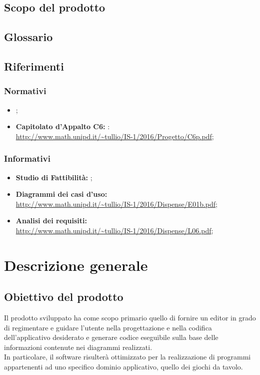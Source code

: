 	\subsection{Scopo del prodotto}
	\scopo{}
	
	\subsection{Glossario}
	\presgloss{}
	
	\subsection{Riferimenti}
		\subsubsection{Normativi}
		\begin{itemize}
			\item \emph{\NdP};
			\item \textbf{Capitolato d'Appalto C6: \proj}:
			\\ \url{http://www.math.unipd.it/~tullio/IS-1/2016/Progetto/C6p.pdf};
		\end{itemize}
		
		\subsubsection{Informativi}
		\begin{itemize}
			\item \textbf{Studio di Fattibilità: }\emph{\SdF};
			\item \textbf{Diagrammi dei casi d'uso:}
			\\ \url{http://www.math.unipd.it/~tullio/IS-1/2016/Dispense/E01b.pdf};
			\item \textbf{Analisi dei requisiti:}
			\\ \url{http://www.math.unipd.it/~tullio/IS-1/2016/Dispense/L06.pdf};
		\end{itemize}
\newpage

\section{Descrizione generale}
	\subsection{Obiettivo del prodotto}
	Il prodotto sviluppato  ha come scopo primario quello di fornire un editor in grado di regimentare e guidare l'utente nella progettazione e nella codifica dell'applicativo desiderato e generare codice eseguibile sulla base delle informazioni contenute nei diagrammi realizzati. 
	\\In particolare, il software risulterà ottimizzato per la realizzazione di programmi appartenenti ad uno specifico dominio applicativo, quello dei giochi da tavolo.
